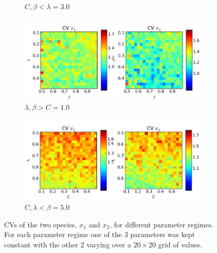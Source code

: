 \documentclass[a4paper,12pt]{article}
\begin{document}
\begin{figure}[!ht]
\begin{subfigure}[b]{0.496\textwidth}
                \caption{$C, \beta < \lambda=3.0$}
                \label{fig:vars4}
        \end{subfigure}
          \newline
        \begin{subfigure}[b]{0.496\textwidth}
                \includegraphics[width=\textwidth]{images/vars5}
                \caption{$\lambda, \beta > C=1.0$}
                \label{fig:vars5}
        \end{subfigure}
        \begin{subfigure}[b]{0.496\textwidth}
                \includegraphics[width=\textwidth]{images/vars6}
                \caption{$C, \lambda < \beta=5.0$}
                \label{fig:vars6}
        \end{subfigure}
        
        \caption{CVs of the two species, $x_1$ and $x_2$, for different parameter regimes. For each parameter regime one of the 3 parameters was kept constant with the other 2 varying over a $20 \times 20$ grid of values.}\label{fig:vars}
\end{figure}
\end{document}
